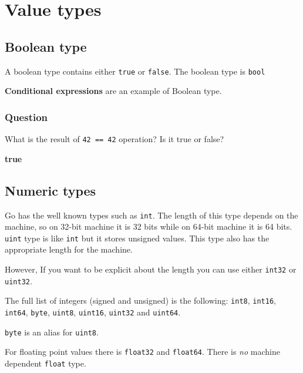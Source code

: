 \documentclass[]{book}
\let\BeginKnitrBlock\begin \let\EndKnitrBlock\end
\begin{document}
\hypertarget{value-types}{%
\section{Value types}\label{value-types}}

\hypertarget{boolean-type}{%
\subsection{Boolean type}\label{boolean-type}}

A boolean type contains either \texttt{true} or \texttt{false}. The boolean type is \texttt{bool}

\BeginKnitrBlock{rmdnote}
\textbf{Conditional expressions} are an example of Boolean type.
\EndKnitrBlock{rmdnote}

\hypertarget{question-5}{%
\subsubsection*{Question}\label{question-5}}

What is the result of \texttt{42\ ==\ 42} operation? Is it true or false?

\textbf{true}

\hypertarget{numeric-types}{%
\subsection{Numeric types}\label{numeric-types}}

Go has the well known types such as \texttt{int}. The length of this type depends on
the machine, so on 32-bit machine it is 32 bits while on 64-bit machine it is
64 bits. \texttt{uint} type is like \texttt{int} but it stores unsigned values. This type
also has the appropriate length for the machine.

However, If you want to be explicit about the length you can use either \texttt{int32}
or \texttt{uint32}.

The full list of integers (signed and unsigned) is the following: \texttt{int8},
\texttt{int16}, \texttt{int64}, \texttt{byte}, \texttt{uint8}, \texttt{uint16}, \texttt{uint32} and \texttt{uint64}.

\BeginKnitrBlock{rmdnote}
\texttt{byte} is an alias for \texttt{uint8}.
\EndKnitrBlock{rmdnote}

For floating point values there is \texttt{float32} and \texttt{float64}. There is \emph{no}
machine dependent \texttt{float} type.
\end{document}

